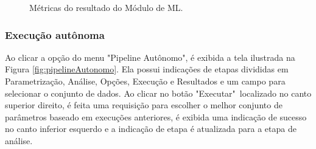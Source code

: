 \documentclass[Portugues,Final]{ic-tese-v3}
\begin{document}
\begin{figure}[H]
    \centering
    \caption{Métricas do resultado do Módulo de ML.}
    \label{fig:pipelineManualMetricas}
\end{figure}

\subsubsection{Execução autônoma}

Ao clicar a opção do menu "Pipeline Autônomo", é exibida a tela ilustrada na Figura \ref{fig:pipelineAutonomo}. Ela possui indicações de etapas divididas em Parametrização, Análise, Opções, Execução e Resultados e um campo para selecionar o conjunto de dados. Ao clicar no botão "Executar"~localizado no canto superior direito, é feita uma requisição para escolher o melhor conjunto de parâmetros baseado em execuções anteriores, é exibida uma indicação de sucesso no canto inferior esquerdo e a indicação de etapa é atualizada para a etapa de análise.
\end{document}
